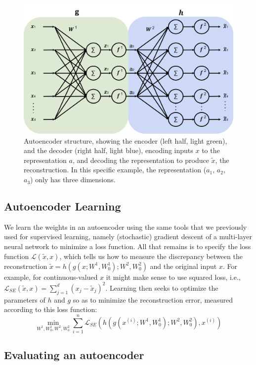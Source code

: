 \begin{figure}[h]
  \centering
  \includegraphics[width=.7\textwidth]{figures/autoencoder.png}
  \caption{\small Autoencoder structure, showing the encoder (left
    half, light green), and the decoder (right half, light blue),
    encoding inputs $x$ to the representation $a$, and decoding the
    representation to produce $\tilde{x}$, the reconstruction.  In
    this specific example, the representation ($a_1$, $a_2$, $a_3$)
    only has three dimensions.\label{fig:autoencoder}}
\end{figure}

\subsection{Autoencoder Learning}

We learn the weights in an autoencoder using the same tools that we previously used for
supervised learning, namely (stochastic) gradient descent of a
multi-layer neural network to minimize a loss function. All that
remains is to specify the loss function $\mathcal{L}(\tilde{x}, x)$, which tells
us how to measure the discrepancy between the reconstruction
$\tilde{x} = h(g(x; W^{1}, W^1_0); W^{2}, W^2_0)$ and the original input $x$. For
example, for continuous-valued $x$ it might make sense to use squared
loss, i.e., $\mathcal{L}_{SE}(\tilde{x}, x) = \sum_{j=1}^{d} (x_j -
  \tilde{x}_j)^2$. Learning then seeks to optimize the
parameters of $h$ and $g$ so as to minimize the reconstruction error,
measured according to this loss function:
\[
  \min_{W^{1}, W^1_0, W^{2}, W^2_0} \sum_{i=1}^n \mathcal{L}_{SE}\left(h(g(x^{(i)}; W^{1}, W^1_0); W^{2}, W^2_0), x^{(i)}\right)
\]

\subsection{Evaluating an autoencoder}

